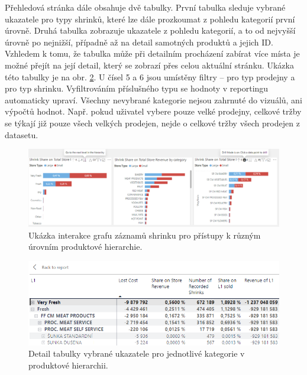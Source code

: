 Přehledová stránka dále obsahuje dvě tabulky. První tabulka sleduje vybrané ukazatele pro typy shrinků, které lze dále prozkoumat z pohledu kategorií první úrovně. Druhá tabulka zobrazuje ukazatele z pohledu kategorií, a to od nejvyšší úrovně po nejnižší, případně až na detail samotných produktů a jejich ID. Vzhledem k tomu, že tabulka může při detailním procházení zabírat více místa je možné přejít na její detail, který se zobrazí přes celou aktuální stránku. Ukázka této tabulky je na obr. \ref*{obr:PBI:tab1}.
U čísel 5 a 6 jsou umístěny filtry -- pro typ prodejny a pro typ shrinku. Vyfiltrováním příslušného typu se hodnoty v reportingu automaticky upraví. Všechny nevybrané kategorie nejsou zahrnuté do vizuálů, ani výpočtů hodnot. Např. pokud uživatel vybere pouze velké prodejny, celkové tržby se týkají již pouze všech velkých prodejen, nejde o celkové tržby všech prodejen z datasetu.

\begin{figure}[hbtp!]
    \centering
    \captionsetup{justification=centering}
    \includegraphics[width=\textwidth]{obrazky/PBI/Catdrilldown.png}
    \caption{Ukázka interakce grafu záznamů shrinku pro přístupy k různým úrovním produktové hierarchie.}
    \label{obr:PBI:drill}
\end{figure}

\begin{figure}[hbtp!]
    \centering
    \captionsetup{justification=centering}
    \includegraphics[width=\textwidth]{obrazky/PBI/tabulkaukzka.png}
    \caption{Detail tabulky vybrané ukazatele pro jednotlivé kategorie v produktové hierarchii.}
    \label{obr:PBI:tab1}
\end{figure}

